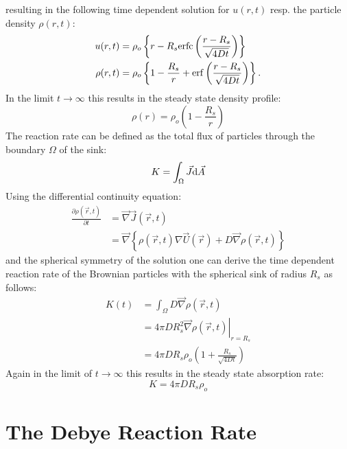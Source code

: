 resulting in the following time dependent solution for $u(r,t)$ resp. the particle density $\rho(r,t)$:
\begin{align}
    u(r,t) &= \rho_o \left\{ r - R_s {\rm erfc} \left( \frac{r - R_s}{\sqrt{4 D t}} \right) \right\} \\
    \rho(r,t) &= \rho_o \left\{ 1 - \frac{R_s}{r} + {\rm erf} \left( \frac{r - R_s}{\sqrt{4Dt}} \right) \right\}.
    \label{u(r,t)}
\end{align}
In the limit $t \rightarrow \infty$ this results in the steady state density profile:
\begin{equation}
    \rho(r) =  \rho_o \left( 1 - \frac{R_s}{r} \right)
    \label{steady_state_density}
\end{equation}
The reaction rate can be defined as the total flux of particles through the boundary $\Omega$ of the sink:
\begin{equation}
    K = \int_\Omega \vec{J} {\rm d}\vec{A} 
    \label{reaction rate}
\end{equation}
Using the differential continuity equation:
\begin{align}
    \frac{\partial \rho(\vec{r},t)}{\partial t}&= \vec{\nabla} \vec{J}(\vec{r},t) \\
    &= \vec{\nabla} \left\{ \rho(\vec{r},t) \nabla \vec{U}(\vec{r}) + D \vec{\nabla} \rho(\vec{r},t) \right\}
    \label{contiuity equation}
\end{align}
and the spherical symmetry of the solution one can derive the time dependent reaction rate of the Brownian particles with the spherical sink of radius $R_s$ as follows:
\begin{align}
    K(t) &= \int_\Omega D  \vec{\nabla} \rho(\vec{r},t) \\
    &= 4 \pi D R_s^2 \left. \vec{\nabla} \rho(\vec{r},t) \right|_{r = R_s}\\
    &= 4 \pi D R_s \rho_o \left( 1 + \frac{R_s}{\sqrt{4Dt}} \right)
    \label{ideal reaction rate}
\end{align}
Again in the limit of $t \rightarrow \infty$ this results in the steady state absorption rate:
\begin{equation}
    K = 4 \pi D R_s \rho_o
    \label{steady state ideal rate}
\end{equation}

\section{The Debye Reaction Rate}

